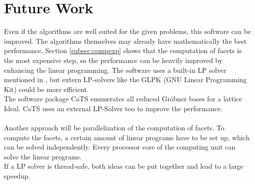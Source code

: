 \section{Future Work}
\label{sec:future}
Even if the algorithms are well suited for the given problems, this software can be improved.
The algorithms themselves may already have mathematically the best performance. 
Section \ref{subsec:compexp} shows that the computation of facets is the most expensive step, so the performance can be heavily improved by enhancing the linear programming.
The software uses a built-in LP solver mentioned in \cite{tigers}, but extern LP-solvers like the GLPK (GNU Linear Programming Kit) could be more efficient. \\
The software package CaTS \cite{cats} enumerates all reduced Gröbner bases for a lattice Ideal. CaTS uses an external LP-Solver too to improve the performance.
\\\\
Another approach will be parallelization of the computation of facets. To compute the facets, a certain amount of linear programs have to be set up, which can be solved independently. Every processor core of the computing unit can solve the linear programs.\\
If a LP solver is thread-safe, both ideas can be put together and lead to a large speedup. 

\newpage